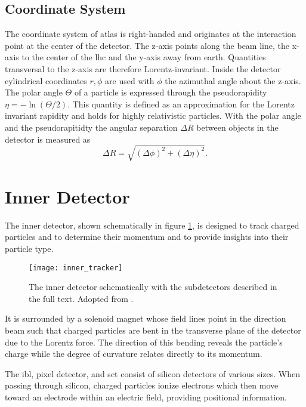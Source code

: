 \subsection{Coordinate System}
The coordinate system of \ac{atlas} is right-handed and originates at the interaction point at the center of the detector. The z-axis points along the beam line, the x-axis to the center of the \ac{lhc} and the y-axis away from earth. Quantities transversal to the z-axis are therefore Lorentz-invariant. Inside the detector cylindrical coordinates $r,\phi$ are used with $\phi$ the azimuthal angle about the z-axis. The polar angle $\Theta$ of a particle is expressed through the pseudorapidity $\eta=-\ln(\Theta/2)$. This quantity is defined as an approximation for the Lorentz invariant rapidity and holds for highly relativistic particles. With the polar angle and the pseudorapitidty the angular separation $\Delta R$ between objects in the detector is measured as
\begin{equation}
    \Delta R = \sqrt{(\Delta\phi)^2+(\Delta \eta)^2}.
    \label{eq:delta_R}
\end{equation}

\section{Inner Detector}\label{sec:inner_detector}
The inner detector, shown schematically in figure \ref{fig:inner_tracker}, is designed to track charged particles and to determine their momentum and to provide insights into their particle type.
\begin{figure}
    \centering
    \texttt{[image: inner\_tracker]}
    \caption[]{The inner detector schematically with the subdetectors described in the full text. Adopted from \citep{Potamianos:2016ptf}.}
    \label{fig:inner_tracker}
\end{figure}
It is surrounded by a solenoid magnet whose field lines point in the direction beam such that charged particles are bent in the transverse plane of the detector due to the Lorentz force. The direction of this bending reveals the particle's charge while the degree of curvature relates directly to its momentum.

The \ac{ibl}, pixel detector, and \ac{sct} consist of silicon detectors of various sizes. When passing through silicon, charged particles ionize electrons which then move toward an electrode within an electric field, providing positional information.

